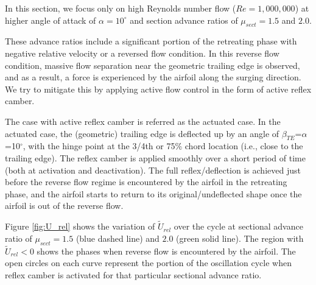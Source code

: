 In this section, we focus only on high Reynolds number flow ($Re=1,000,000$) at higher angle of attack of $\alpha=10^\circ$ and section advance ratios of $\mu_{sect}= 1.5$ and $2.0$. 

These advance ratios include a significant portion of the retreating phase with negative relative velocity or a reversed flow condition. 
In this reverse flow condition, massive flow separation near the geometric trailing edge is observed, and as a result, a force is experienced by the airfoil along the surging direction. 
We try to mitigate this by applying active flow control in the form of active reflex camber. 

The case with active reflex camber is referred as the actuated case.
In the actuated case, the (geometric) trailing edge is deflected up by an angle of $\beta_{TE}$=$\alpha$=10$^\circ$, with the hinge point at the 3/4th or 75\% chord location (i.e., close to the trailing edge).
The reflex camber is applied smoothly over a short period of time (both at activation and deactivation).
The full reflex/deflection is achieved just before the reverse flow regime is encountered by the airfoil in the retreating phase, and the airfoil starts to return to its original/undeflected shape once the airfoil is out of the reverse flow.

Figure \ref{fig:U_rel} shows the variation of $\tilde{U}_{rel}$ over the cycle at sectional advance ratio of $\mu_{sect}=1.5$ (blue dashed line) and $2.0$ (green solid line).
The region with $\tilde{U}_{rel}<0$ shows the phases when reverse flow is encountered by the airfoil.
The open circles on each curve represent the portion of the oscillation cycle when reflex camber is activated for that particular sectional advance ratio.



